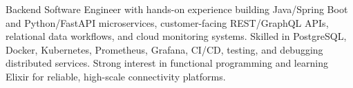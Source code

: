 \par{
Backend Software Engineer with hands-on experience building Java/Spring Boot and Python/FastAPI microservices, customer-facing REST/GraphQL APIs, relational data workflows, and cloud monitoring systems. Skilled in PostgreSQL, Docker, Kubernetes, Prometheus, Grafana, CI/CD, testing, and debugging distributed services. Strong interest in functional programming and learning Elixir for reliable, high-scale connectivity platforms.
}
